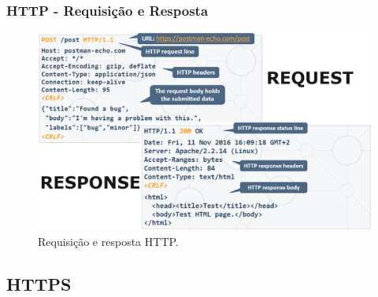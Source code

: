 \documentclass[
	10pt, %
	t, %
]{beamer}
\begin{document}
\begin{frame}
	\frametitle{HTTP - Requisição e Resposta}

	\begin{figure}
		\centering
		\includegraphics[width=0.9\linewidth]{req_res.png}
		\caption{Requisição e resposta HTTP.}
		\label{fig:http_req_res}
	\end{figure}

\end{frame}

\subsection{HTTPS}
\setcounter{footnote}{0}
\end{document}
